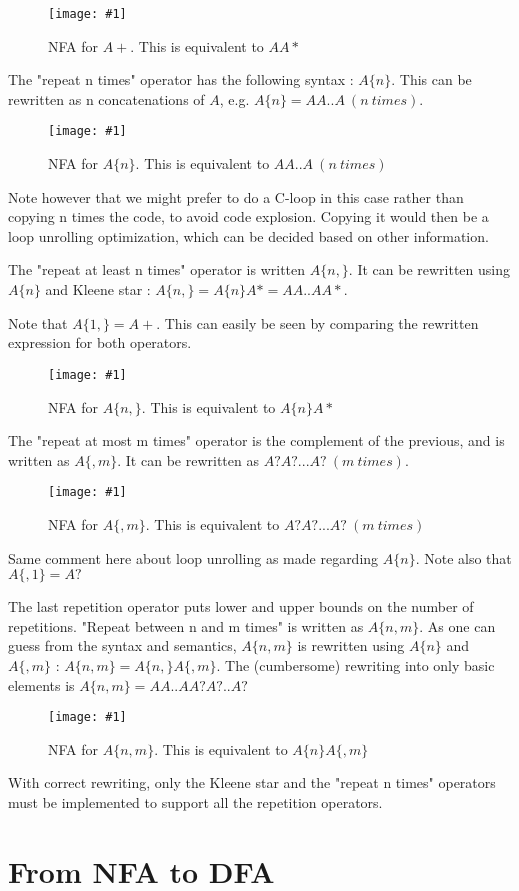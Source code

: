 \documentclass[11pt,a4paper]{report}
\newcommand{\regexp}[1]{$#1$}
\newcommand{\insertfa}[3]{
\begin{figure}[h!]
	\centering
	\texttt{[image: \#1]}
	\caption{#2}
\end{figure}
}
\newcommand{\smallnfa}[2]{\insertfa{./img/nfa/#1.png}{NFA for #2}{scale=0.7}}
\newcommand{\largenfa}[2]{\insertfa{./img/nfa/#1.png}{NFA for #2}{width=\textwidth}}
\begin{document}
\smallnfa{repeat-at-least-once}{\regexp{A+}. This is equivalent to \regexp{AA*}}

The "repeat n times" operator has the following syntax : \regexp{A\{n\}}. This can be rewritten as n concatenations of $A$, e.g. \regexp{A\{n\} = AA..A\ (n\ times)}.

\smallnfa{repeat-n-times}{\regexp{A\{n\}}. This is equivalent to \regexp{AA..A\ (n\ times)}}

Note however that we might prefer to do a C-loop in this case rather than copying n times the code, to avoid code explosion. Copying it would then be a loop unrolling optimization, which can be decided based on other information.

The "repeat at least n times" operator is written \regexp{A\{n,\}}. It can be rewritten using \regexp{A\{n\}} and Kleene star : \regexp{A\{n,\} = A\{n\}A* = AA..AA*}.

Note that \regexp{A\{1,\} = A+}. This can easily be seen by comparing the rewritten expression for both operators.

\largenfa{repeat-at-least-n-times}{\regexp{A\{n,\}}. This is equivalent to \regexp{A\{n\}A*}}

The "repeat at most m times" operator is the complement of the previous, and is written as \regexp{A\{,m\}}. It can be rewritten as \regexp{A?A?...A?\ (m\ times)}.

\largenfa{repeat-at-most-m-times}{\regexp{A\{,m\}}. This is equivalent to \regexp{A?A?...A?\ (m\ times)}}

Same comment here about loop unrolling as made regarding \regexp{A\{n\}}. Note also that \regexp{A\{,1\} = A?}

The last repetition operator puts lower and upper bounds on the number of repetitions. "Repeat between n and m times" is written as \regexp{A\{n, m\}}. As one can guess from the syntax and semantics, \regexp{A\{n, m\}} is rewritten using \regexp{A\{n\}} and \regexp{A\{, m\}} : \regexp{A\{n, m\} = A\{n, \}A\{, m\}}. The (cumbersome) rewriting into only basic elements is \regexp{A\{n, m\} = AA..AA?A?..A?}

\largenfa{repeat-between-n-and-m-times}{\regexp{A\{n,m\}}. This is equivalent to \regexp{A\{n\}A\{,m\}}}

With correct rewriting, only the Kleene star and the "repeat n times" operators must be implemented to support all the repetition operators.

\section{From NFA to DFA}
\label{nfatodfa}
\end{document}
